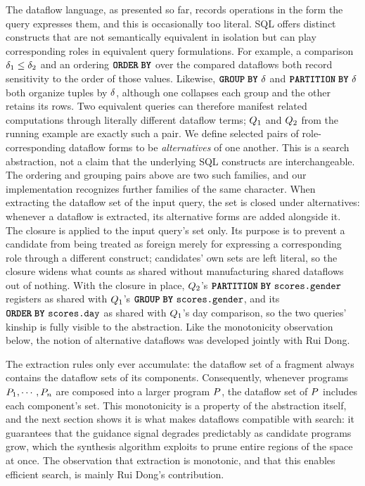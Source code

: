 The dataflow language, as presented so far, records operations in the
form the query expresses them, and this is occasionally too literal.
SQL offers distinct constructs that are not semantically equivalent in
isolation but can play corresponding roles in equivalent query
formulations. For example, a comparison
$\delta_1 \leq \delta_2$ and an ordering
$\sqlorderbycolor$ over the compared dataflows both record sensitivity
to the order of those values. Likewise, ${\color{black}{{\textbf{\texttt{GROUP}}\;\textbf{\texttt{BY}}}}} \
\delta$ and $\sqlpartitionbycolor \ \dataflowchain$ both
organize tuples by $\delta$, although one collapses each group
and the other retains its rows. Two equivalent queries can therefore
manifest related computations through literally different dataflow
terms; $Q_1$ and $Q_2$ from the running example are exactly
such a pair. We define selected pairs of role-corresponding dataflow
forms to be \emph{alternatives} of one another. This is a search
abstraction, not a claim that the underlying SQL constructs are
interchangeable. The ordering and grouping pairs above are two such
families, and our implementation recognizes further families of the
same character. When extracting the
dataflow set of the input query, the set is closed under alternatives:
whenever a dataflow is extracted, its alternative forms are added
alongside it. The closure is applied to the input query's set only.
Its purpose is to prevent a candidate from being treated as foreign
merely for expressing a corresponding role through a different
construct; candidates' own sets are left literal, so the closure
widens what counts as shared without manufacturing shared dataflows
out of nothing. With the closure in place, $Q_2$'s
$\sqlpartitionbycolor \ \texttt{scores.gender}$ registers as shared
with $Q_1$'s ${\color{black}{{\textbf{\texttt{GROUP}}\;\textbf{\texttt{BY}}}}} \ \texttt{scores.gender}$, and its
$\sqlorderbycolor \ \texttt{scores.day}$ as shared with $Q_1$'s
day comparison, so the two queries' kinship is fully visible to the
abstraction. Like the monotonicity observation below, the notion of
alternative dataflows was developed jointly with Rui Dong.

The extraction rules only ever accumulate: the dataflow set of a
fragment always contains the dataflow sets of its components.
Consequently, whenever programs $P_1, \cdots, P_n$ are
composed into a larger program $P$, the dataflow set of
$P$ includes each component's set. This monotonicity is a
property of the abstraction itself, and the next section shows it is
what makes dataflows compatible with search: it guarantees that the
guidance signal degrades predictably as candidate programs grow, which
the synthesis algorithm exploits to prune entire regions of the space
at once. The observation that extraction is monotonic, and that this
enables efficient search, is mainly Rui Dong's contribution.

